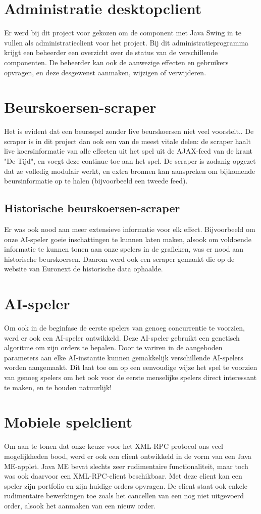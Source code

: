 \section{Administratie desktopclient}
Er werd bij dit project voor gekozen om de component met Java Swing in te vullen als administratieclient voor het project. Bij dit administratieprogramma krijgt een beheerder een overzicht over de status van de verschillende componenten. De beheerder kan ook de aanwezige effecten en gebruikers opvragen, en deze desgewenst aanmaken, wijzigen of verwijderen.

\section{Beurskoersen-scraper}
Het is evident dat een beursspel zonder live beurskoersen niet veel voorstelt.. De scraper is in dit project dan ook een van de meest vitale delen: de scraper haalt live koersinformatie van alle effecten uit het spel uit de AJAX-feed van de krant "De Tijd", en voegt deze continue toe aan het spel. De scraper is zodanig opgezet dat ze volledig modulair werkt, en extra bronnen kan aanspreken om bijkomende beursinformatie op te halen (bijvoorbeeld een tweede feed).
\subsection{Historische beurskoersen-scraper}
Er was ook nood aan meer extensieve informatie voor elk effect. Bijvoorbeeld om onze AI-speler goeie inschattingen te kunnen laten maken, alsook om voldoende informatie te kunnen tonen aan onze spelers in de grafieken, was er nood aan historische beurskoersen. Daarom werd ook een scraper gemaakt die op de website van Euronext de historische data ophaalde.

\section{AI-speler}
Om ook in de beginfase de eerste spelers van genoeg concurrentie te voorzien, werd er ook een AI-speler ontwikkeld. Deze AI-speler gebruikt een genetisch algoritme om zijn orders te bepalen. Door te variren in de aangeboden parameters aan elke AI-instantie kunnen gemakkelijk verschillende AI-spelers worden aangemaakt. Dit laat toe om op een eenvoudige wijze het spel te voorzien van genoeg spelers om het ook voor de eerste menselijke spelers direct interessant te maken, en te houden natuurlijk!

\section{Mobiele spelclient}
Om aan te tonen dat onze keuze voor het XML-RPC protocol ons veel mogelijkheden bood, werd er ook een client ontwikkeld in de vorm van een Java ME-applet. Java ME bevat slechts zeer rudimentaire functionaliteit, maar toch was ook daarvoor een XML-RPC-client beschikbaar.
Met deze client kan een speler zijn portfolio en zijn huidige orders opvragen. De client staat ook enkele rudimentaire bewerkingen toe zoals het cancellen van een nog niet uitgevoerd order, alsook het aanmaken van een nieuw order.


